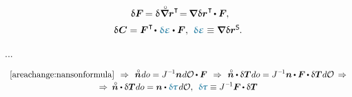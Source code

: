 \begin{equation}
\begin{array}{c}
\:\,
\variation{\bm{F}} \hspace{-0.2ex} = \variation{\hspace{.1ex} \boldnablacircled \currentlocationvector^{\T}} \hspace{-0.4ex}
= \hspace{-0.2ex} \boldnabla \hspace{.1ex} \variation{\currentlocationvector}^{\hspace{.1ex}\T} \hspace{-0.25ex} \dotp \bm{F}
\hspace{-0.1ex} ,
\\[.5em]
%
\variation{\hspace{.1ex}\bm{C}} = \bm{F}^{\hspace{.1ex}\T} \hspace{-0.3ex} \dotp \hspace{.1ex} \infinimentpetitdeformationdevariation \dotp \bm{F} ,
\:\,
\infinimentpetitdeformationdevariation \equiv \boldnabla \hspace{.1ex} \variation{\currentlocationvector}^{\mathsf{S}}
\hspace{-0.15ex} .
\end{array}
\end{equation}

...

\begin{equation*}\begin{array}{c}
\eqref{areachange:nansonformula}
\hspace{.4em} \Rightarrow \hspace{.4em}
%
\initialunitnormal \hspace{.1ex} do = J^{\hspace{.1ex}\expminusone} \currentunitnormal \hspace{.1ex} d\mathcal{O} \hspace{-0.1ex} \dotp \bm{F}
\hspace{.4em} \Rightarrow \hspace{.4em}
%
\initialunitnormal \dotp \variation{\firstpiolakirchhoffstress} \hspace{.1ex} do
= J^{\hspace{.12ex}\expminusone} \currentunitnormal \hspace{-0.1ex} \dotp \bm{F} \hspace{-0.1ex} \dotp \variation{\firstpiolakirchhoffstress} \hspace{.1ex} d\mathcal{O}
\,\Rightarrow
\\[.2em]
%
\Rightarrow\:
\initialunitnormal \dotp \variation{\firstpiolakirchhoffstress} \hspace{.1ex} do
= \currentunitnormal \dotp \varbivalent{\hspace{-0.2ex}\cauchystress} \hspace{.25ex} d\mathcal{O} ,
\:\:
\varbivalent{\hspace{-0.2ex}\cauchystress} \equiv J^{\hspace{.12ex}\expminusone} \bm{F} \hspace{-0.1ex} \dotp \variation{\firstpiolakirchhoffstress}
\end{array}\end{equation*}

